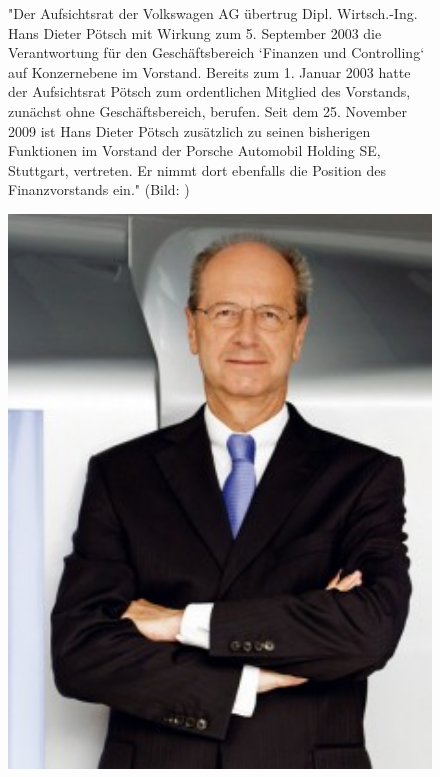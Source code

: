 \documentclass[12pt]{article}
\begin{document}
\begin{figure}[here!]
	\centering
	\begin{minipage}[h]{0.65\textwidth}
		"Der Aufsichtsrat der Volkswagen AG übertrug Dipl. Wirtsch.-Ing. Hans Dieter Pötsch mit Wirkung zum 5. September 2003 die Verantwortung für den Geschäftsbereich ‘Finanzen und Controlling‘ auf Konzernebene im Vorstand. Bereits zum 1. Januar 2003 hatte der Aufsichtsrat Pötsch zum ordentlichen Mitglied des Vorstands, zunächst ohne Geschäftsbereich, berufen. Seit dem 25. November 2009 ist Hans Dieter Pötsch zusätzlich zu seinen bisherigen Funktionen im Vorstand der Porsche Automobil Holding SE, Stuttgart, vertreten. Er nimmt dort ebenfalls die Position des Finanzvorstands ein."\cite{poetschbio}  (Bild: \cite{dppic} )
	\end{minipage}
	\begin{minipage}[h]{0.10\textwidth}
		\hspace{1cm} 
	\end{minipage}
	\begin{minipage}[h]{0.20\textwidth}
		\centering
		\includegraphics[width=1.0\textwidth]{images/HansPoetsch.jpg}
		\label{fig:vorstandvw7}
	\end{minipage}
\end{figure}
\end{document}
